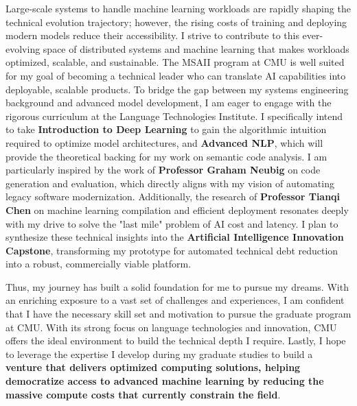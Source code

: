 \documentclass[12pt]{article}
\begin{document}
\vspace{0.5em}
Large-scale systems to handle machine learning workloads are rapidly shaping the technical evolution trajectory; however, the rising costs of training and deploying modern models reduce their accessibility. I strive to contribute to this ever-evolving space of distributed systems and machine learning that makes workloads optimized, scalable, and sustainable. The MSAII program at CMU is well suited for my goal of becoming a technical leader who can translate AI capabilities into deployable, scalable products. To bridge the gap between my systems engineering background and advanced model development, I am eager to engage with the rigorous curriculum at the Language Technologies Institute. I specifically intend to take \textbf{Introduction to Deep Learning} to gain the algorithmic intuition required to optimize model architectures, and \textbf{Advanced NLP}, which will provide the theoretical backing for my work on semantic code analysis. I am particularly inspired by the work of \textbf{Professor Graham Neubig} on code generation and evaluation, which directly aligns with my vision of automating legacy software modernization. Additionally, the research of \textbf{Professor Tianqi Chen} on machine learning compilation and efficient deployment resonates deeply with my drive to solve the "last mile" problem of AI cost and latency. I plan to synthesize these technical insights into the \textbf{Artificial Intelligence Innovation Capstone}, transforming my prototype for automated technical debt reduction into a robust, commercially viable platform.

\vspace{0.5em}
\noindent Thus, my journey has built a solid foundation for me to pursue my dreams. With an enriching exposure to a vast set of challenges and experiences, I am confident that I have the necessary skill set and motivation to pursue the graduate program at CMU. With its strong focus on language technologies and innovation, CMU offers the ideal environment to build the technical depth I require. Lastly, I hope to leverage the expertise I develop during my graduate studies to build a \textbf{venture that delivers optimized computing solutions, helping democratize access to advanced machine learning by reducing the massive compute costs that currently constrain the field}.
\end{document}
